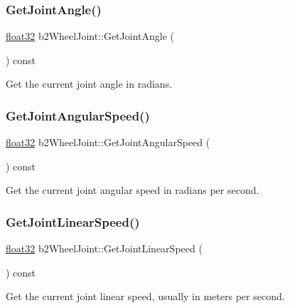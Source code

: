 \subsubsection{\texorpdfstring{GetJointAngle()}{GetJointAngle()}}
{\footnotesize\ttfamily \mbox{\hyperlink{b2_settings_8h_aacdc525d6f7bddb3ae95d5c311bd06a1}{float32}} b2\+Wheel\+Joint\+::\+Get\+Joint\+Angle (\begin{DoxyParamCaption}{ }\end{DoxyParamCaption}) const}



Get the current joint angle in radians. 

\mbox{\label{classb2_wheel_joint_aaf5a4e3713ceca98c2afda950e67ff9d}} 
\subsubsection{\texorpdfstring{GetJointAngularSpeed()}{GetJointAngularSpeed()}}
{\footnotesize\ttfamily \mbox{\hyperlink{b2_settings_8h_aacdc525d6f7bddb3ae95d5c311bd06a1}{float32}} b2\+Wheel\+Joint\+::\+Get\+Joint\+Angular\+Speed (\begin{DoxyParamCaption}{ }\end{DoxyParamCaption}) const}



Get the current joint angular speed in radians per second. 

\mbox{\label{classb2_wheel_joint_a3cbdc95c55c9bf5b9f2b46b05fc2a5e5}} 
\subsubsection{\texorpdfstring{GetJointLinearSpeed()}{GetJointLinearSpeed()}}
{\footnotesize\ttfamily \mbox{\hyperlink{b2_settings_8h_aacdc525d6f7bddb3ae95d5c311bd06a1}{float32}} b2\+Wheel\+Joint\+::\+Get\+Joint\+Linear\+Speed (\begin{DoxyParamCaption}{ }\end{DoxyParamCaption}) const}



Get the current joint linear speed, usually in meters per second. 

